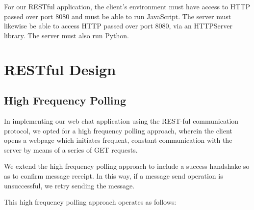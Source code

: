 \documentclass[11pt]{article} %
\begin{document}
For our RESTful application, the client's environment must have access to HTTP passed over port 8080 and must be able to run JavaScript. The server must likewise be able to access HTTP passed over port 8080, via an HTTPServer library. The server must also run Python.

\section{RESTful Design}

\subsection{High Frequency Polling} 


 In implementing our web chat application using the REST-ful communication protocol, we opted for a high frequency polling approach, wherein the client opens a webpage which initiates frequent, constant communication with the server by means of a series of GET requests. 
 
We extend the high frequency polling approach to include a success handshake so as to confirm message receipt. In this way, if a message send operation is unsuccessful, we retry sending the message.


 This high frequency polling approach operates as follows: 
\end{document}
